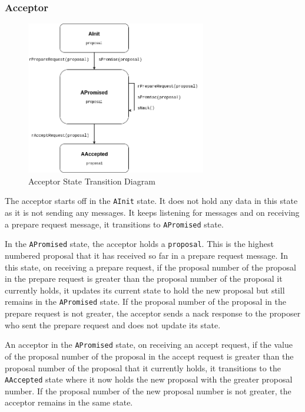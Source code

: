 \subsubsection{Acceptor}
\begin{figure}
\centering
\includegraphics[width=0.7\textwidth]{figures/acceptor_state_transitions.png}
\caption{Acceptor State Transition Diagram
\label{fig:myInlineFigure}}
\end{figure}

The acceptor starts off in the \texttt{AInit} state. It does not hold any data
in this state as it is not sending any messages. It keeps listening for messages
and on receiving a prepare request message, it transitions to \texttt{APromised}
state.

In the \texttt{APromised} state, the acceptor holds a \texttt{proposal}. This is
the highest numbered proposal that it has received so far in a prepare request
message. In this state, on receiving a prepare request, if the proposal number
of the proposal in the prepare request is greater than the proposal number of
the proposal it currently holds, it updates its current state to hold the new
proposal but still remains in the \texttt{APromised} state. If the proposal
number of the proposal in the prepare request is not greater, the acceptor
sends a nack response to the proposer who sent the prepare request and does not
update its state.

An acceptor in the \texttt{APromised} state, on receiving an accept request, if
the value of the proposal number of the proposal in the accept request is greater than
the proposal number of the proposal that it currently holds, it transitions to the
\texttt{AAccepted} state where it now holds the new proposal with the greater
proposal number. If the proposal number of the new proposal number is not greater,
the acceptor remains in the same state.

